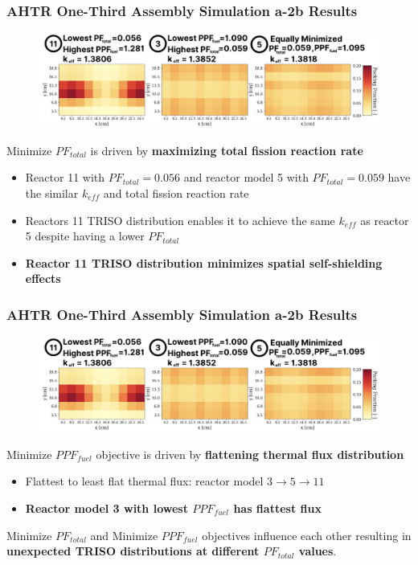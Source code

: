 \begin{frame}
    \frametitle{AHTR One-Third Assembly Simulation a-2b Results}
    \begin{figure}
        \centering
        \includegraphics[width=\linewidth]{figures/a-2b-comparison-reactors.png}
    \end{figure}

    Minimize $PF_{total}$ is driven by \textbf{maximizing total fission reaction rate} 
    \begin{itemize}
        \item Reactor 11 with $PF_{total} = 0.056$ and reactor model 5 with 
        $PF_{total} = 0.059$ have the similar $k_{eff}$ and total fission reaction rate 
        \item Reactors 11 TRISO distribution enables it to achieve the same $k_{eff}$ 
        as reactor 5 despite having a lower $PF_{total}$
        \item \textbf{Reactor 11 TRISO distribution minimizes spatial self-shielding 
        effects}
    \end{itemize}
\end{frame}

\begin{frame}
    \frametitle{AHTR One-Third Assembly Simulation a-2b Results}
    \begin{figure}
        \centering
        \includegraphics[width=\linewidth]{figures/a-2b-comparison-reactors.png}
    \end{figure}

    Minimize $PPF_{fuel}$ objective is driven by \textbf{flattening thermal 
    flux distribution}  
    \begin{itemize}
        \item Flattest to least flat thermal flux: reactor model 
                $3 \rightarrow 5 \rightarrow 11$
        \item \textbf{Reactor model 3 with lowest $PPF_{fuel}$ has flattest flux}
    \end{itemize}

    \begin{tcolorbox}[colback=illiniorange,colframe=illiniorange!50!black]
        Minimize $PF_{total}$ and Minimize $PPF_{fuel}$ objectives 
        influence each other resulting in \textbf{unexpected TRISO distributions at 
        different $PF_{total}$ values}. 
    \end{tcolorbox}
\end{frame}

